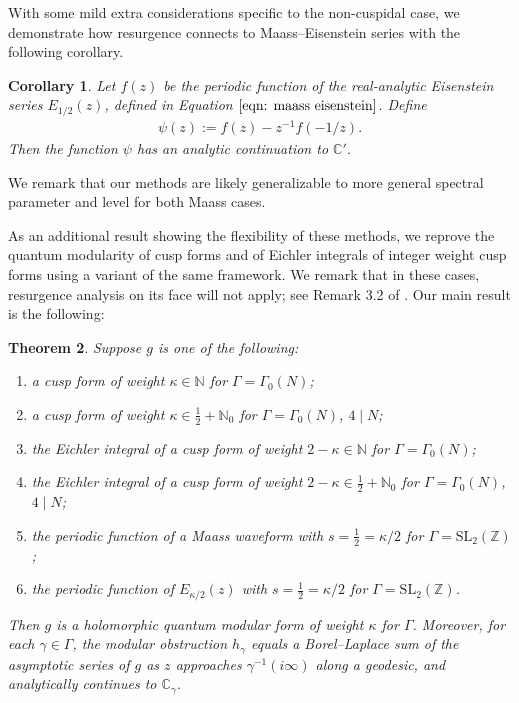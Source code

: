 \documentclass[12pt]{amsart}
\newtheorem{theorem}{Theorem}[section]
\theoremstyle{definition}
\theoremstyle{plain}
\newtheorem{cor}[theorem]{Corollary}
\numberwithin{equation}{section}
\begin{document}
With some mild extra considerations specific to the non-cuspidal case, we demonstrate how resurgence connects to Maass--Eisenstein series with the following corollary. 

\begin{cor}
Let $f(z)$ be the periodic function of the real-analytic Eisenstein series $E_{1/2}(z)$, defined in Equation $\ref{eqn: maass eisenstein}$. Define
\begin{align*}
	\psi(z):= f(z)  -  z^{-1}f(-1/z). 
\end{align*}
	Then the function $\psi$ has an analytic continuation to $\mathbb{C}'$. 
	\end{cor}

We remark that our methods are likely generalizable to more general spectral parameter and level for both Maass cases. 

As an additional result showing the flexibility of these methods, we reprove the quantum modularity of cusp forms and of Eichler integrals of integer weight cusp forms using a variant of the same framework. We remark that in these cases, resurgence analysis on its face will not apply; see Remark 3.2 of \cite{fantini-rella}. 
Our main result is the following:

\begin{theorem} \label{thm: Main} 
Suppose $g$ is one of the following:
\begin{enumerate}
\item a cusp form of weight $\kappa \in \mathbb{N}$ for $\Gamma =\Gamma_0(N)$;
\item a cusp form of weight $\kappa \in \frac{1}{2} + \mathbb{N}_0$ for $\Gamma =\Gamma_0(N)$, $4\mid N$;
\item the Eichler integral of a cusp form of weight $2-\kappa \in \mathbb{N}$ for $\Gamma =\Gamma_0(N)$;
\item the Eichler integral of a cusp form of weight $2-\kappa \in \frac{1}{2} + \mathbb{N}_0$ for $\Gamma =\Gamma_0(N)$, $4\mid N$;
\item the periodic function of a Maass waveform with $s=\frac{1}{2} = \kappa/2$ for $\Gamma =\text{SL}_2(\mathbb{Z})$;
\item the periodic function of $E_{\kappa/2}(z)$ with $s=\frac{1}{2}=\kappa/2$ for $\Gamma =\text{SL}_2(\mathbb{Z})$.
\end{enumerate}
Then $g$ is a holomorphic quantum modular form of weight $\kappa$ for $\Gamma$. Moreover, for each $\gamma \in \Gamma$, the modular obstruction $h_\gamma$ equals a Borel--Laplace sum of the asymptotic series of $g$ as $z$ approaches $\gamma^{-1}(i\infty)$ along a geodesic, and analytically continues to $\mathbb{C}_\gamma$.
\end{theorem}
\end{document}
